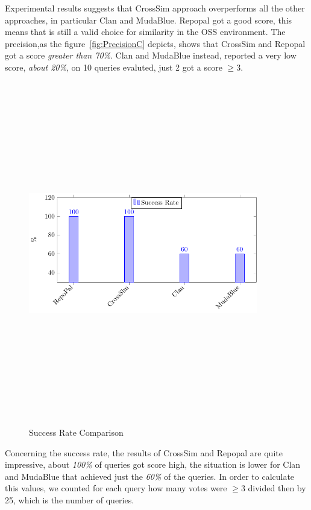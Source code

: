 Experimental results suggests that CrossSim approach overperforms all the other approaches, in particular Clan and MudaBlue.
Repopal got a good score, this means that is still a valid choice for similarity in the OSS environment.
The precision,as the figure~\ref{fig:PrecisionC} depicts, shows that CrossSim and Repopal got a score \emph{greater than 70\%}.
Clan and MudaBlue instead, reported a very low score, \emph{about 20\%}, on 10 queries evaluted, just 2 got a score \emph{$\geq3$}.

\begin{figure}[H]
\includegraphics[width=10cm,height=15cm,keepaspectratio]{images/SuccessRate.pdf}
\centering
\caption{Success Rate Comparison}
\label{fig:SuccessC}
\end{figure}

Concerning the success rate, the results of CrossSim and Repopal are quite impressive, about \emph{100\%} of queries got score high, the situation is lower for Clan and MudaBlue that achieved just the \emph{60\%} of the queries. In order to calculate this values, we counted for each query how many votes were \emph{$\geq3$} divided then by 25, which is the number of queries.


